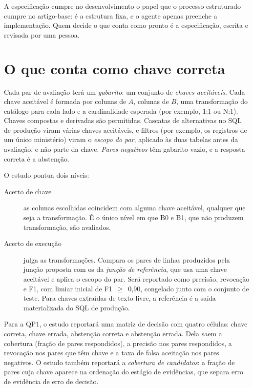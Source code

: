 A especificação cumpre no desenvolvimento o papel que o processo estruturado
cumpre no artigo-base: é a estrutura fixa, e o agente apenas preenche a
implementação. Quem decide o que conta como pronto é a especificação, escrita
e revisada por uma pessoa.

\section{O que conta como chave correta}
\label{sec:metodologia-chave-correta}

Cada par de avaliação terá um \emph{gabarito}: um conjunto de \emph{chaves
aceitáveis}. Cada chave aceitável é formada por colunas de $A$, colunas de
$B$, uma transformação do catálogo para cada lado e a cardinalidade esperada
(por exemplo, 1:1 ou N:1). Chaves compostas e derivadas são permitidas.
Cascatas de alternativas no SQL de produção viram várias chaves aceitáveis, e
filtros (por exemplo, os registros de um único ministério) viram o
\emph{escopo do par}, aplicado às duas tabelas antes da avaliação, e não parte
da chave. \emph{Pares negativos} têm gabarito vazio, e a resposta correta é a
abstenção.

O estudo pontua dois níveis:

\begin{description}
\item[Acerto de chave] as colunas escolhidas coincidem com alguma chave
aceitável, qualquer que seja a transformação. É o único nível em que B0 e B1,
que não produzem transformação, são avaliados.
\item[Acerto de execução] julga as transformações. Compara os pares de linhas
produzidos pela junção proposta com os da \emph{junção de referência}, que
usa uma chave aceitável e aplica o escopo do par. Será reportado como
precisão, revocação e F1, com limiar inicial de F1~$\geq$~0,90, congelado
junto com o conjunto de teste. Para chaves extraídas de texto livre, a
referência é a saída materializada do SQL de produção.
\end{description}

Para a QP1, o estudo reportará uma matriz de decisão com quatro células:
chave correta, chave errada, abstenção correta e abstenção errada. Dela saem a
cobertura (fração de pares respondidos), a precisão nos pares respondidos, a
revocação nos pares que têm chave e a taxa de falsa aceitação nos pares
negativos. O estudo também reportará a \emph{cobertura de candidatos}: a
fração de pares cuja chave aparece na ordenação do estágio de evidências, que
separa erro de evidência de erro de decisão.

